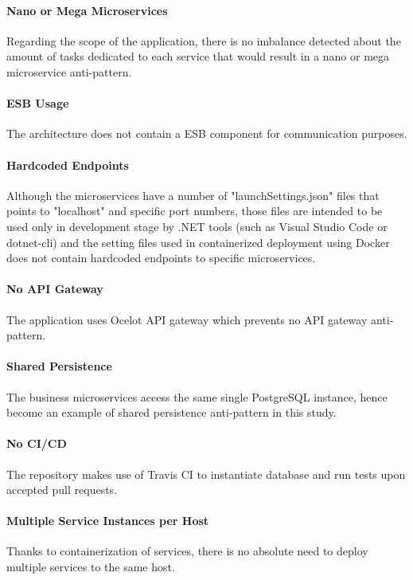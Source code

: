 \documentclass{Configuration_Files/PoliMi3i_thesis}
\begin{document}
\paragraph{Nano or Mega Microservices} Regarding the scope of the application, there is no imbalance detected about the amount of tasks dedicated to each service that would result in a nano or mega microservice anti-pattern.

\paragraph{ESB Usage} The architecture does not contain a ESB component for communication purposes.

\paragraph{Hardcoded Endpoints} Although the microservices have a number of "launchSettings.json" files that points to "localhost" and specific port numbers, those files are intended to be used only in development stage by .NET tools (such as Visual Studio Code or dotnet-cli) and the setting files used in containerized deployment using Docker does not contain hardcoded endpoints to specific microservices.

\paragraph{No API Gateway} The application uses Ocelot API gateway which prevents no API gateway anti-pattern.

\paragraph{Shared Persistence} The business microservices access the same single PostgreSQL instance, hence become an example of shared persistence anti-pattern in this study.

\paragraph{No CI/CD} The repository makes use of Travis CI to instantiate database and run tests upon accepted pull requests.

\paragraph{Multiple Service Instances per Host} Thanks to containerization of services, there is no absolute need to deploy multiple services to the same host.
\end{document}

